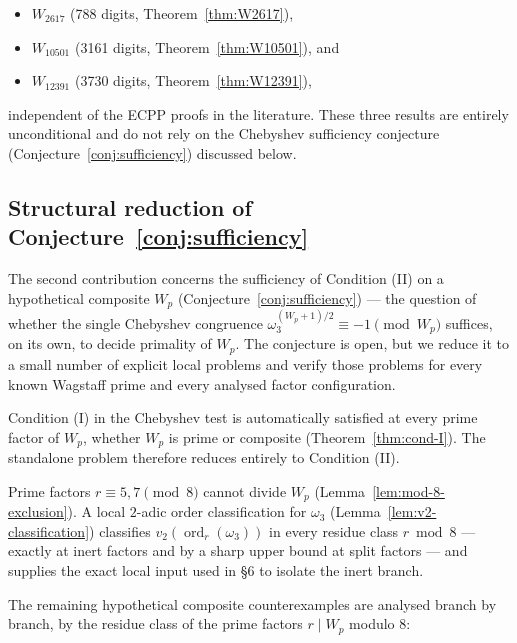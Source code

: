 \documentclass[12pt]{article}
\theoremstyle{plain}
\theoremstyle{definition}
\theoremstyle{remark}
\begin{document}
\begin{itemize}
\item \(W_{2617}\) (788 digits, Theorem~\ref{thm:W2617}),
\item \(W_{10501}\) (3161 digits, Theorem~\ref{thm:W10501}), and
\item \(W_{12391}\) (3730 digits, Theorem~\ref{thm:W12391}),
\end{itemize}

independent of the ECPP proofs in the literature. These three
results are entirely unconditional and do not rely on the
Chebyshev sufficiency conjecture (Conjecture~\ref{conj:sufficiency}) discussed
below.

\subsection{Structural reduction of Conjecture~\ref{conj:sufficiency}}\label{sec:status-table}


The second contribution concerns the sufficiency of Condition (II)
on a hypothetical composite \(W_p\) (Conjecture~\ref{conj:sufficiency}) --- the
question of whether the single Chebyshev congruence
\(\omega_3^{(W_p+1)/2} \equiv -1 \pmod{W_p}\) suffices, on its
own, to decide primality of \(W_p\). The conjecture is open,
but we reduce it to a small number of explicit local problems
and verify those problems for every known Wagstaff prime and
every analysed factor configuration.

Condition (I) in the Chebyshev test is automatically satisfied at every
prime factor of \(W_p\), whether \(W_p\) is prime or composite
(Theorem~\ref{thm:cond-I}). The standalone problem therefore reduces entirely to
Condition (II).

Prime factors \(r \equiv 5, 7 \pmod{8}\) cannot divide \(W_p\)
(Lemma~\ref{lem:mod-8-exclusion}). A local \(2\)-adic order classification for
\(\omega_3\) (Lemma~\ref{lem:v2-classification}) classifies
\(v_2(\operatorname{ord}_r(\omega_3))\) in every residue class
\(r \bmod 8\) --- exactly at inert factors and by a sharp upper
bound at split factors --- and supplies the exact local input
used in \S6 to isolate the inert branch.

The remaining hypothetical composite counterexamples are analysed
branch by branch, by the residue class of the prime factors
\(r \mid W_p\) modulo 8:
\end{document}

